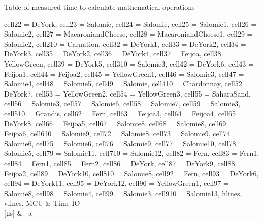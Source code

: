 \begin{table}[H]
	\centering
	\caption{Table of measured time to calculate mathematical operations}\label{TestTimeT}

	\begin{adjustbox}{width=\textwidth}

		\begin{tblr}{
				cell{2}{2} = {DeYork},
				cell{2}{3} = {Salomie},
				cell{2}{4} = {Salomie},
				cell{2}{5} = {Salomie1},
				cell{2}{6} = {Salomie2},
				cell{2}{7} = {MacaroniandCheese},
				cell{2}{8} = {MacaroniandCheese1},
				cell{2}{9} = {Salomie2},
				cell{2}{10} = {Carnation},
				cell{3}{2} = {DeYork1},
				cell{3}{3} = {DeYork2},
				cell{3}{4} = {DeYork3},
				cell{3}{5} = {DeYork2},
				cell{3}{6} = {DeYork4},
				cell{3}{7} = {Feijoa},
				cell{3}{8} = {YellowGreen},
				cell{3}{9} = {DeYork5},
				cell{3}{10} = {Salomie3},
				cell{4}{2} = {DeYork6},
				cell{4}{3} = {Feijoa1},
				cell{4}{4} = {Feijoa2},
				cell{4}{5} = {YellowGreen1},
				cell{4}{6} = {Salomie3},
				cell{4}{7} = {Salomie4},
				cell{4}{8} = {Salomie5},
				cell{4}{9} = {Salomie},
				cell{4}{10} = {Chardonnay},
				cell{5}{2} = {DeYork7},
				cell{5}{3} = {YellowGreen2},
				cell{5}{4} = {YellowGreen3},
				cell{5}{5} = {SaharaSand},
				cell{5}{6} = {Salomie3},
				cell{5}{7} = {Salomie6},
				cell{5}{8} = {Salomie7},
				cell{5}{9} = {Salomie3},
				cell{5}{10} = {Grandis},
				cell{6}{2} = {Fern},
				cell{6}{3} = {Feijoa3},
				cell{6}{4} = {Feijoa4},
				cell{6}{5} = {DeYork8},
				cell{6}{6} = {Feijoa5},
				cell{6}{7} = {Salomie8},
				cell{6}{8} = {Salomie8},
				cell{6}{9} = {Feijoa6},
				cell{6}{10} = {Salomie9},
				cell{7}{2} = {Salomie8},
				cell{7}{3} = {Salomie9},
				cell{7}{4} = {Salomie6},
				cell{7}{5} = {Salomie6},
				cell{7}{6} = {Salomie9},
				cell{7}{7} = {Salomie10},
				cell{7}{8} = {Salomie5},
				cell{7}{9} = {Salomie11},
				cell{7}{10} = {Salomie12},
				cell{8}{2} = {Fern},
				cell{8}{3} = {Fern1},
				cell{8}{4} = {Fern1},
				cell{8}{5} = {Fern2},
				cell{8}{6} = {DeYork},
				cell{8}{7} = {DeYork9},
				cell{8}{8} = {Feijoa2},
				cell{8}{9} = {DeYork10},
				cell{8}{10} = {Salomie8},
				cell{9}{2} = {Fern},
				cell{9}{3} = {DeYork6},
				cell{9}{4} = {DeYork11},
				cell{9}{5} = {DeYork12},
				cell{9}{6} = {YellowGreen1},
				cell{9}{7} = {Salomie8},
				cell{9}{8} = {Salomie4},
				cell{9}{9} = {Salomie3},
				cell{9}{10} = {Salomie13},
				hlines,
				vlines,
			}
			MCU                                 & {Time IO\\{[}μs]} & {~a~
}
\end{tblr}
\end{adjustbox}
\end{table}
